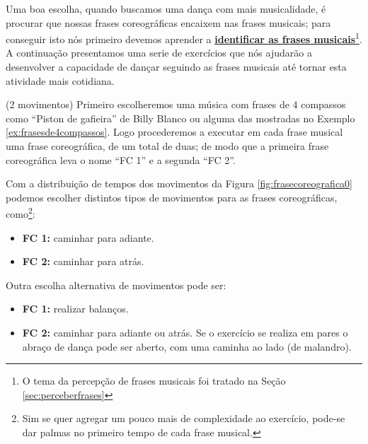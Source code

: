 Uma boa escolha, quando buscamos uma dança com mais musicalidade, 
é procurar que nossas frases coreográficas 
encaixem nas frases musicais;
para conseguir isto nós primeiro devemos aprender a 
\hyperref[sec:perceberfrases]{\textbf{identificar as frases musicais}}\footnote{O 
tema da percepção de frases musicais foi tratado na Seção \ref{sec:perceberfrases}}.
A continuação presentamos uma serie de exercícios 
que nós ajudarão a desenvolver a capacidade de dançar seguindo as frases musicais 
até tornar esta atividade mais cotidiana.
\begin{example}
\label{ex:usandofrases1}
(2 movimentos)
Primeiro escolheremos uma música com frases de 4 compassos como ``Piston de gafieira'' de Billy Blanco 
ou alguma das mostradas no Exemplo \ref{ex:frasesde4compassos}.
Logo procederemos a executar em cada frase musical uma frase coreográfica, de um total de duas;
de modo que a primeira frase coreográfica leva o nome ``FC 1'' e a segunda ``FC 2''.

Com a distribuição de tempos dos movimentos da Figura \ref{fig:frasecoreografica0}  
podemos escolher distintos tipos de movimentos para as frases coreográficas, 
como\footnote{Sim 
se quer agregar um pouco mais de complexidade ao exercício,
pode-se dar palmas no primeiro tempo de cada frase musical.}:
\begin{itemize}
\item \textbf{FC 1:} caminhar para adiante.
\item \textbf{FC 2:} caminhar para atrás.
\end{itemize}
Outra  escolha alternativa de movimentos pode ser:
\begin{itemize}
\item \textbf{FC 1:} realizar balanços.
\item \textbf{FC 2:} caminhar para adiante ou atrás. 
Se o exercício se realiza em pares o abraço de dança pode ser aberto, 
com uma caminha ao lado (de malandro). 
\end{itemize}
\end{example}


